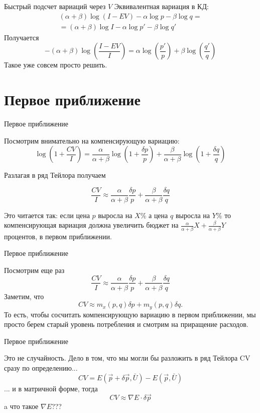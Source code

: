 \documentclass{beamer}
\begin{document}
\begin{frame}{Быстрый подсчет вариаций через $V$}
Эквивалентная вариация в КД:
\begin{gather*}
 (\alpha + \beta)\log (I - EV) - \alpha \log p - \beta \log q = \\ =
  (\alpha + \beta)\log I - \alpha \log p' - \beta \log q'
\end{gather*}
Получается
$$-(\alpha + \beta)\log(\frac{I - EV}{I}) = \alpha \log (\frac{p'}{p}) + \beta \log (\frac{q'}{q}) $$
Такое уже совсем просто решить.
\end{frame}

\section{Первое приближение}

\begin{frame}{Первое приближение}

Посмотрим внимательно на компенсирующую вариацию:
$$\log(1 + \frac{CV}{I}) = \frac{\alpha}{\alpha + \beta} \log (1 + \frac{\delta p}{p}) + \frac{\beta}{\alpha + \beta} \log (1 + \frac{\delta q}{q})$$

Разлагая в ряд Тейлора получаем

$$\frac{CV}{I} \approx \frac{\alpha}{\alpha + \beta} \frac{\delta p}{p} + \frac{\beta}{\alpha + \beta} \frac{\delta q}{q}$$

Это читается так: если цена $p$ выросла на $X \%$ а цена $q$ выросла на $Y \%$ то компенсирующая вариация должна увеличить бюджет на $\frac{\alpha}{\alpha + \beta} X + \frac{\beta}{\alpha + \beta} Y$ процентов, в первом приближении.

\end{frame}

\begin{frame}{Первое приближение}

Посмотрим еще раз
$$\frac{CV}{I} \approx \frac{\alpha}{\alpha + \beta} \frac{\delta p}{p} + \frac{\beta}{\alpha + \beta} \frac{\delta q}{q}$$
Заметим, что 
$$CV \approx m_x(p,q) \delta p + m_y(p,q) \delta q.$$
То есть, чтобы сосчитать компенсирующую вариацию в первом приближении, мы просто берем старый уровень потребления и смотрим на приращение расходов.

\end{frame}

\begin{frame}{Первое приближение}

Это не случайность. Дело в том, что мы могли бы разложить в ряд Тейлора CV сразу по определению...
$$ CV = E(\vec p +  \delta \vec p, \bar U) - E(\vec p, \bar U)$$ 
... и в матричной форме, тогда
$$ CV \approx \nabla E \cdot  \delta \vec p$$ 
a что такое $\nabla E$???
\end{frame}
\end{document}
